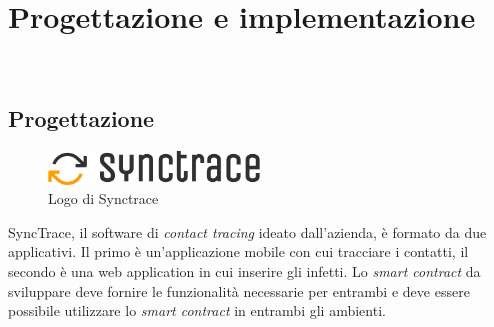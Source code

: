 
\chapter{Progettazione e implementazione}
\label{cap:progettazione-codifica}

\\


\section{Progettazione}
\begin{figure}[h]
\caption{Logo di Synctrace}
\centering
\includegraphics[width=0.5\textwidth]{./immagini/logo_synctrace}
\end{figure}
SyncTrace, il software di \textit{contact tracing} ideato dall'azienda, è formato da due applicativi. Il primo è un'applicazione mobile con cui tracciare i contatti, il secondo è una web application in cui inserire gli infetti.
Lo \textit{smart contract} da sviluppare deve fornire le funzionalità necessarie per entrambi e deve essere possibile utilizzare lo \textit{smart contract} in entrambi gli ambienti.
